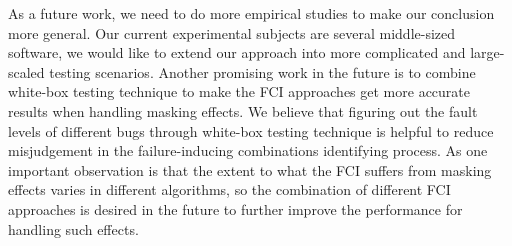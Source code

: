 \documentclass{sig-alternate}
\begin{document}
As a future work, we need to do more empirical studies to make our conclusion more general. Our current experimental subjects are several middle-sized software, we would like to extend our approach into more complicated and large-scaled testing scenarios. Another promising work in the future is to combine white-box testing technique to make the FCI approaches get more accurate results when handling masking effects. We believe that figuring out the fault levels of different bugs through white-box testing technique is helpful to reduce misjudgement in the failure-inducing combinations identifying process. As one important observation is that the extent to what the FCI suffers from masking effects varies in different algorithms, so the combination of different FCI approaches is desired in the future to further improve the performance for handling
such effects.



%

%
%
%
\end{document}
